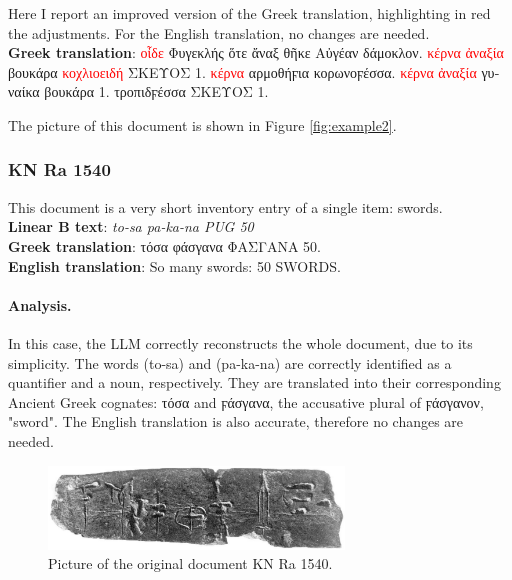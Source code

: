 Here I report an improved version of the Greek translation, highlighting in red the adjustments. For the English translation, no changes are needed. \\
\textbf{Greek translation}: \textcolor{red}{\textgreek{οἶδε}} \textgreek{Φυγεκλής ὅτε ἄναξ θῆκε Αὐγέαν δάμοκλον.} \textcolor{red}{\textgreek{κέρνα ἀναξία}} \textgreek{βουκάρα} \textcolor{red}{\textgreek{κοχλιοειδή}} \textgreek{ΣΚΕΥΟΣ 1.} \textcolor{red}{\textgreek{κέρνα}} \textgreek{αρμοθήϝια κορωνοϝέσσα}. \textcolor{red}{\textgreek{κέρνα ἀναξία}} \textgreek{γυναίκα βουκάρα 1. τροπιδϝέσσα ΣΚΕΥΟΣ 1.}

The picture of this document is shown in Figure \ref{fig:example2}.

\subsubsection{KN Ra 1540}
This document is a very short inventory entry of a single item: swords. \\
\textbf{Linear B text}: \textit{to-sa pa-ka-na PUG 50} \\
\textbf{Greek translation}: \textgreek{τόσα φάσγανα ΦΑΣΓΑΝΑ 50.} \\
\textbf{English translation}: So many swords: 50 SWORDS.
\paragraph{Analysis.}
In this case, the LLM correctly reconstructs the whole document, due to its simplicity.
The words \textlinb{\Bto\Bsa} (to-sa) and \textlinb{\Bpa\Bka\Bna} (pa-ka-na) are correctly identified as a quantifier and a noun, respectively.
They are translated into their corresponding Ancient Greek cognates: \textgreek{τόσα} and \textgreek{ϝάσγανα}, the accusative plural of \textgreek{ϝάσγανον}, "sword".
The English translation is also accurate, therefore no changes are needed.

\begin{figure}[H]
  \centering
  \includegraphics[width=0.7\textwidth]{Images/250.png} %
  \caption{Picture of the original document KN Ra 1540.}
  \label{fig:doc2}
\end{figure}

